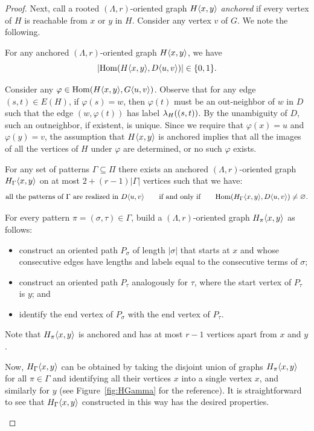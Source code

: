 \begin{proof}
	Next,
	call a rooted $(\Lambda,r)$-oriented graph $H\langle x,y\rangle$ \emph{anchored} if every vertex of $H$ is reachable from $x$ or $y$ in $H$. Consider any vertex $v$ of $G$. We note the following.
	
	\begin{claim}\label{cl:unambigious}
		For any anchored $(\Lambda,r)$-oriented graph $H\langle x,y\rangle$, we have \[|\mathrm{Hom}(H\langle x,y\rangle,D\langle u,v\rangle)|\in \{0,1\}.\]
	\end{claim}
	\begin{claimproof}
		Consider any $\varphi\in \mathrm{Hom}(H\langle x,y\rangle,G\langle u,v\rangle)$. Observe that for any edge $(s,t)\in E(H)$, if $\varphi(s)=w$, then $\varphi(t)$ must be an out-neighbor of $w$ in $D$ such that the edge $(w,\varphi(t))$ has label $\lambda_H((s,t))$. By the unambiguity of $D$, such an outneighbor, if existent, is unique. Since we require that $\varphi(x)=u$ and $\varphi(y)=v$, the assumption that $H\langle x,y\rangle$ is anchored implies that all the images of all the vertices of $H$ under $\varphi$ are determined, or no such $\varphi$ exists.
	\end{claimproof}
	 
	\begin{claim}\label{cl:testing-subset}
		For any set of patterns $\Gamma\subseteq \Pi$ there exists an anchored $(\Lambda,r)$-oriented graph $H_\Gamma\langle x,y\rangle$ on at most $2+(r-1)|\Gamma|$ vertices such that we have:
			\[\textrm{all the patterns of }\Gamma\textrm{ are realized in } D\langle u,v\rangle\qquad \textrm{if and only if}\qquad \mathrm{Hom}(H_\Gamma\langle x,y\rangle,D\langle u,v\rangle)\neq \varnothing.\]
	\end{claim}
	\begin{claimproof}
		For every pattern $\pi=(\sigma,\tau)\in \Gamma$, build a $(\Lambda,r)$-oriented graph $H_\pi\langle x,y\rangle$ as follows:
		\begin{itemize} 
			\item construct an oriented path $P_\sigma$ of length $|\sigma|$ that starts at $x$ and whose consecutive edges have lengths and labels equal to the consecutive terms of $\sigma$;
			\item construct an oriented path $P_\tau$ analogously for $\tau$, where the start vertex of $P_\tau$ is $y$; and
			\item identify the end vertex of $P_\sigma$ with the end vertex of $P_\tau$.
		\end{itemize}
		Note that $H_\pi\langle x,y\rangle$ is anchored and has at most $r-1$ vertices apart from $x$ and $y$. 
		
		Now, $H_\Gamma\langle x,y\rangle$ can be obtained by taking the disjoint union of graphs $H_\pi\langle x,y\rangle$ for all $\pi\in \Gamma$ and identifying all their vertices $x$ into a single vertex $x$, and similarly for $y$ (see Figure~\ref{fig:HGamma} for the reference). It is straightforward to see that $H_\Gamma\langle x,y\rangle$ constructed in this way has the desired properties.
	\end{claimproof}
	

\end{proof}
